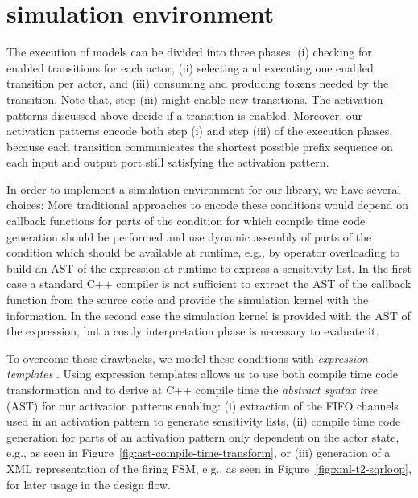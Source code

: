 \section{\SysteMoC{} simulation environment}\label{sec:systemoc-implementation}

The execution of \SysteMoC{} models can be divided into three phases:
(i)   checking for enabled transitions for each actor,
(ii)  selecting and executing one enabled transition per actor, and
(iii) consuming and producing tokens needed by the transition.
Note that, step (iii) might enable new transitions.
The activation patterns discussed above decide if a transition is enabled.
Moreover, our activation patterns encode both step (i) and step (iii) of the execution phases, because each transition communicates the shortest possible prefix sequence on each input and output port still satisfying the activation pattern.

In order to implement a simulation environment for our \SysteMoC{} library, we have several choices:
More traditional approaches to encode these conditions would depend on callback functions for parts of the condition for which compile time code generation should be performed and use dynamic assembly of parts of the condition which should be available at runtime, e.g., by operator overloading to build an AST of the expression at runtime to express a sensitivity list.
In the first case a standard C++ compiler is not sufficient to extract the AST of the callback function from the source code and provide the simulation kernel with the information.
In the second case the simulation kernel is provided with the AST of the expression, but a costly interpretation phase is necessary to evaluate it.

To overcome these drawbacks, we model these conditions with \emph{expression templates} \cite{veldhuizen:1995}.
Using expression templates allows us to use both compile time code transformation and to derive at C++ compile time the \emph{abstract syntax tree} (AST) for our activation patterns enabling:
(i) extraction of the FIFO channels used in an activation pattern to generate sensitivity lists,
(ii) compile time code generation for parts of an activation pattern only dependent on the actor state, e.g., as seen in Figure~\ref{fig:ast-compile-time-transform}, or
(iii) generation of a XML representation of the firing FSM, e.g., as seen in Figure~\ref{fig:xml-t2-sqrloop}, for later usage in the design flow.

